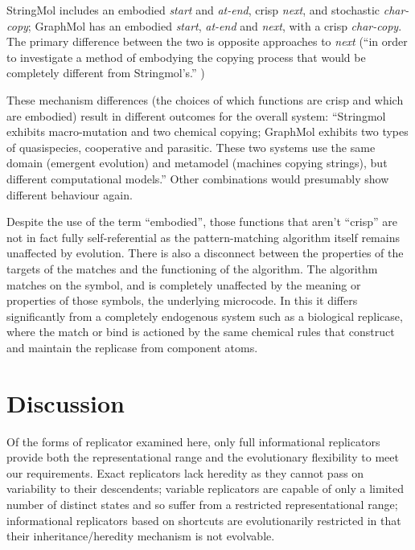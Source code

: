 StringMol includes an embodied \emph{start} and \emph{at-end}, crisp \emph{next}, and stochastic \emph{char-copy}; GraphMol has an embodied \emph{start}, \emph{at-end} and \emph{next}, with a crisp \emph{char-copy}. The primary difference between the two is opposite approaches to \emph{next} (``in order to investigate a method of embodying the copying process that would be completely different from Stringmol's.'' \parencite[p.145]{Nellis2012})

These mechanism differences (the choices of which functions are crisp and which are embodied) result in different outcomes for the overall system: ``Stringmol exhibits macro-mutation and two chemical copying; GraphMol exhibits two types of quasispecies, cooperative and parasitic. These two systems use the same domain (emergent evolution) and metamodel (machines copying strings), but different computational models.'' Other combinations would presumably show different behaviour again.

Despite the use of the term ``embodied'', those functions that aren't ``crisp'' are not in fact fully self-referential as the pattern-matching algorithm itself remains unaffected by evolution. There is also a disconnect between the properties of the targets of the matches and the functioning of the algorithm. The algorithm matches on the symbol, and is completely unaffected by the meaning or properties of those symbols, the underlying microcode. In this it differs significantly from a completely endogenous system such as a biological replicase, where the match or bind is actioned by the same chemical rules that construct and maintain the replicase from component atoms.


\section{Discussion}

Of the forms of replicator examined here, only full informational replicators provide both the representational range and the evolutionary flexibility to meet our requirements. Exact replicators lack heredity as they cannot pass on variability to their descendents; variable replicators are capable of only a limited number of distinct states and so suffer from a restricted representational range; informational replicators based on shortcuts are evolutionarily restricted in that their inheritance/heredity mechanism is not evolvable. 

